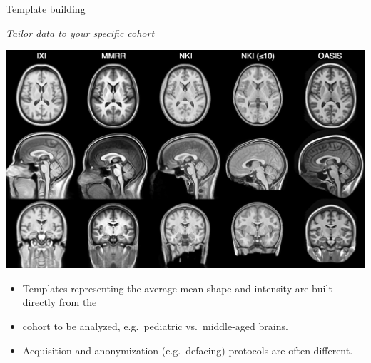 \documentclass[ignorenonframetext,]{beamer}
\providecommand{\tightlist}{%
  \setlength{\itemsep}{0pt}\setlength{\parskip}{0pt}}
\begin{document}
\begin{frame}{Template building}

\emph{Tailor data to your specific cohort}

\includegraphics{./evaluation/figures/templates.png}

\begin{itemize}
\tightlist
\item
  Templates representing the average mean shape and intensity are built
  directly from the
\item
  cohort to be analyzed, e.g.~pediatric vs.~middle-aged brains.
\item
  Acquisition and anonymization (e.g.~defacing) protocols are often
  different.
\end{itemize}

\end{frame}
\end{document}
